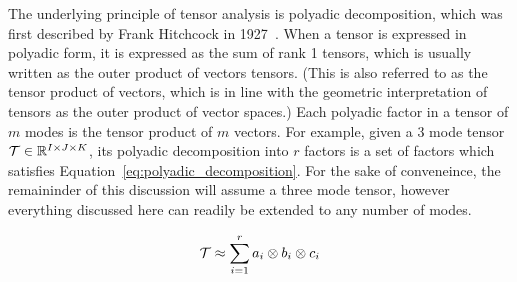 \documentclass[../dissertation.tex]{subfiles}
\begin{document}
The underlying principle of tensor analysis is polyadic decomposition,
which was first described by Frank Hitchcock in
1927~\cite{hitchcock1927}.  When a tensor is expressed in polyadic
form, it is expressed as the sum of rank 1 tensors, which is usually
written as the outer product of vectors
tensors.  (This is also referred to as the tensor product of vectors,
which is in line with the geometric interpretation of tensors as the
outer product of vector spaces.)  Each polyadic factor in a tensor of
$m$ modes is the tensor product of $m$ vectors.  For example, given a
3 mode tensor $\mathcal{T} \in \mathbb{R}^{I\times J \times K}$, its
polyadic decomposition into $r$ factors is a set of factors which
satisfies Equation~\ref{eq:polyadic_decomposition}.  For the sake of
conveneince, the remaininder of this discussion will assume a three
mode tensor, however everything discussed here can readily be extended to
any number of modes.

\begin{equation} \label{eq:polyadic_decomposition}
  \mathcal{T} \approx \displaystyle\sum_{i=1}^{r} a_i \otimes b_i
  \otimes c_i
\end{equation}
\end{document}
